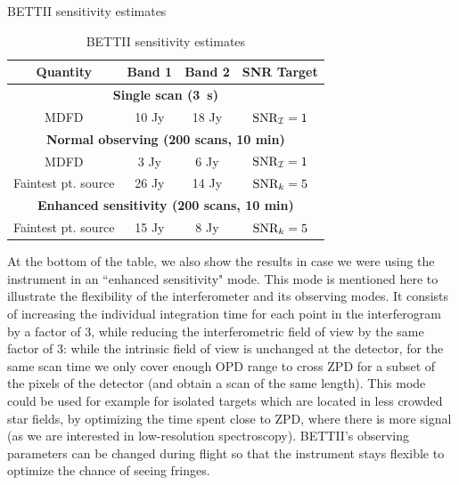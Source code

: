 \begin{table}[ht!]
\begin{center}
\caption{BETTII sensitivity estimates}
\label{tab:BETTIIsensitivity}
\vspace{-0.5cm}
\begin{longtable}{cccc}
\toprule
  Quantity   & Band 1 &  Band 2 & SNR Target \\
     \midrule 
 \multicolumn{4}{c}{\textbf{Single scan (\SI{3}{\second})}} \\
MDFD & 10 Jy  & 18 Jy & $\textrm{SNR}_{\mathcal{I}} = 1$\\ 
\midrule
\multicolumn{4}{c}{\textbf{Normal observing (200 scans, 10 min)}} \\
MDFD & 3 Jy  & 6 Jy & $\textrm{SNR}_{\mathcal{I}} = 1$\\ 
Faintest pt. source & 26 Jy  & 14 Jy & $\textrm{SNR}_k = 5$\\ 
\midrule
\multicolumn{4}{c}{\textbf{Enhanced sensitivity (200 scans, 10 min)}} \\
\midrule
Faintest pt. source & 15 Jy  & 8 Jy & $\textrm{SNR}_k = 5$\\ 
\bottomrule 
\end{longtable} 
\caption{BETTII sensitivity estimates}
\label{tab:sensitivity}
\end{center}
\end{table} 


At the bottom of the table, we also show the results in case we were using the instrument in an ``enhanced sensitivity" mode. This mode is mentioned here to illustrate the flexibility of the interferometer and its observing modes. It consists of increasing the individual integration time for each point in the interferogram by a factor of 3, while reducing the interferometric field of view by the same factor of 3: while the intrinsic field of view is unchanged at the detector, for the same scan time we only cover enough OPD range to cross ZPD for a subset of the pixels of the detector (and obtain a scan of the same length). This mode could be used for example for isolated targets which are located in less crowded star fields, by optimizing the time spent close to ZPD, where there is more signal (as we are interested in low-resolution spectroscopy). BETTII's observing parameters can be changed during flight so that the instrument stays flexible to optimize the chance of seeing fringes.

